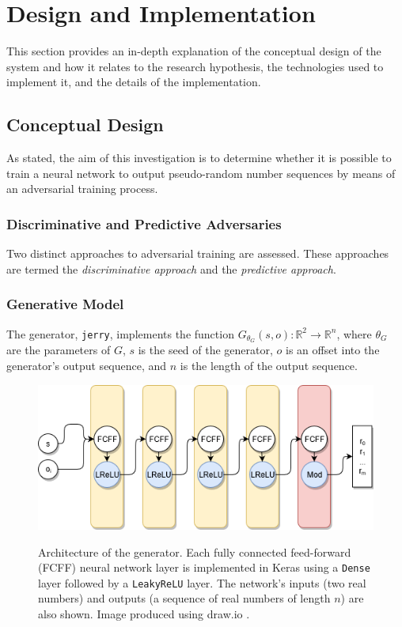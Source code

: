\documentclass[12pt, titlepage]{report}
\theoremstyle{definition}
\begin{document}
\chapter{Design and Implementation}\label{chapter:design}
This section provides an in-depth explanation of the conceptual design of the system and how it relates to the research hypothesis, the technologies used to implement it, and the details of the implementation.

\section{Conceptual Design}\label{section:conceptual_design}
As stated, the aim of this investigation is to determine whether it is possible to train a neural network to output pseudo-random number sequences by means of an adversarial training process.




\subsection{Discriminative and Predictive Adversaries}
Two distinct approaches to adversarial training are assessed. These approaches are termed the \textit{discriminative approach} and the \textit{predictive approach}. 



\subsection{Generative Model}
The generator, \texttt{jerry}, implements the function $G_{\theta_{G}}(s, o) : \mathbb{R}^2 \rightarrow \mathbb{R}^n$, where $\theta_G$ are the parameters of $G$, $s$ is the seed of the generator, $o$ is an offset into the generator's output sequence, and $n$ is the length of the output sequence.


\begin{figure}
\centering
\includegraphics[width=1\textwidth]{img/generator.png}\\
\caption{Architecture of the generator. Each fully connected feed-forward (FCFF) neural network layer is implemented in Keras using a \texttt{Dense} layer followed by a \texttt{LeakyReLU} layer. The network's inputs (two real numbers) and outputs (a sequence of real numbers of length $n$) are also shown. Image produced using draw.io \cite{jgraph2018draw}.}
\label{figure:architecture_generator}
\end{figure}
\end{document}
